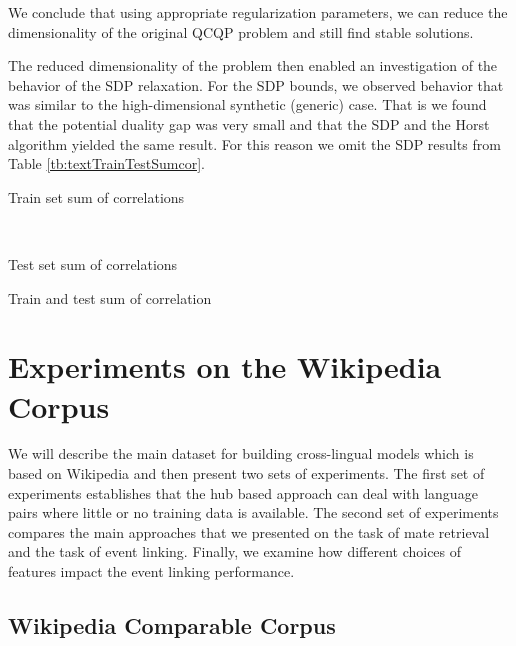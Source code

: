 We conclude that using appropriate regularization parameters, 
we can reduce the dimensionality of the
original QCQP problem and still find stable
solutions. 

The reduced dimensionality of the problem then enabled an investigation of
the behavior of the SDP relaxation. For the SDP bounds, we observed behavior that was 
similar to the high-dimensional synthetic (generic) case. That is
we found that the potential duality gap was very small and that the SDP and the Horst algorithm yielded the same
result. For this reason we omit the SDP results from Table \ref{tb:textTrainTestSumcor}.

\begin{table}[tbp]
    \begin{subtable}[t]{.5\textwidth}
        \centering
        
        \caption{Train set sum of correlations}
        \label{tb:trainText}
    \end{subtable}
    ~
    \begin{subtable}[t]{.5\textwidth}
        \centering
        
        \caption{Test set sum of correlations}
        \label{tb:testText}
    \end{subtable}
  \caption{Train and test sum of correlation}
  \label{tb:textTrainTestSumcor}
\end{table}

\section{Experiments on the Wikipedia Corpus}\label{sec:evaluation}

We will describe the main dataset for building cross-lingual models which is based on Wikipedia and then present two sets of experiments. The first set of experiments
establishes that the hub based approach can deal with language pairs where little or no training data is available. The second set of experiments compares the main approaches
that we presented on the task of mate retrieval and the task of event linking. Finally, we examine how different choices of features impact the event linking performance.

\subsection{Wikipedia Comparable Corpus}


